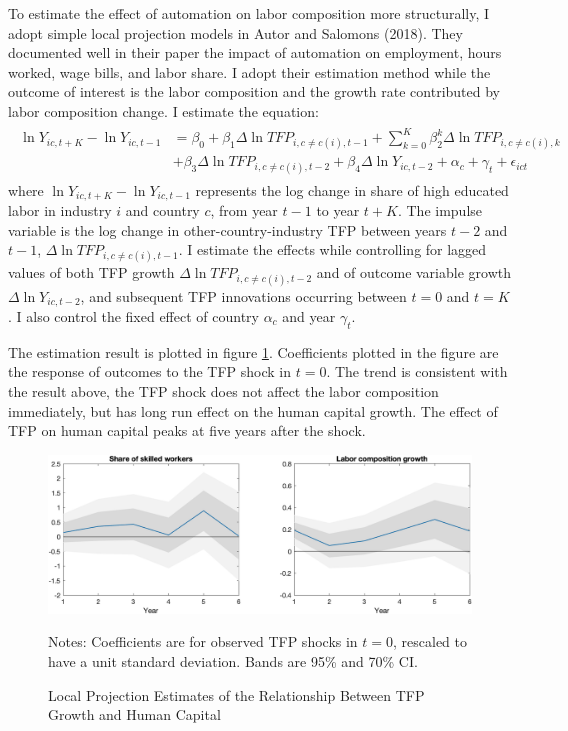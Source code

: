 \documentclass[12pt]{article}
\begin{document}
To estimate the effect of automation on labor composition more structurally, I adopt simple local projection models in Autor and Salomons (2018)\nocite{AutorSalomons2018}. They documented well in their paper the impact of automation on employment, hours worked, wage bills, and labor share. I adopt their estimation method while the outcome of interest is the labor composition and the growth rate contributed by labor composition change. I estimate the equation: 
\begin{align}
\begin{split}
\ln Y_{i c, t+K}-\ln Y_{i c, t-1}&=\beta_{0}+\beta_{1} \Delta \ln TFP_{i, c \neq c(i), t-1}+\sum_{k=0}^{K} \beta_{2}^{k} \Delta \ln TFP_{i, c \neq c(i), k} \\
&+\beta_{3} \Delta \ln T F P_{i, c \neq c(i), t-2}+\beta_{4} \Delta \ln Y_{i c, t-2}+\alpha_{c}+\gamma_{t}+\epsilon_{ict}
\end{split}
\end{align}
where $\ln Y_{i c, t+K}-\ln Y_{i c, t-1}$ represents the log change in share of high educated labor in industry $i$ and country $c$, from year $t-1$ to year $t+K$. The impulse variable is the log change in other-country-industry TFP between years $t-2$ and $t-1$, $\Delta \ln TFP_{i, c \neq c(i), t-1}$. I estimate the effects while controlling for lagged values of both TFP growth $\Delta \ln TFP_{i, c \neq c(i), t-2}$ and of outcome variable growth $\Delta \ln Y_{ic, t-2}$, and subsequent TFP innovations occurring between $t=0$ and $t=K$. I also control the fixed effect of country $\alpha_{c}$ and year $\gamma_{t}$. 

The estimation result is plotted in figure \ref{LP}. Coefficients plotted in the figure are the response of outcomes to the TFP shock in $t = 0$. The trend is consistent with the result above, the TFP shock does not affect the labor composition immediately, but has long run effect on the human capital growth. The effect of TFP on human capital peaks at five years after the shock. 

\begin{figure}[h!]
\includegraphics[width = \textwidth]{LP}
\caption{Local Projection Estimates of the Relationship Between TFP Growth and Human Capital}
\label{LP}
{\scriptsize Notes: Coefficients are for observed TFP shocks in $t = 0$, rescaled to have a unit standard deviation. Bands are 95\% and 70\% CI.}
\end{figure}
\end{document}
